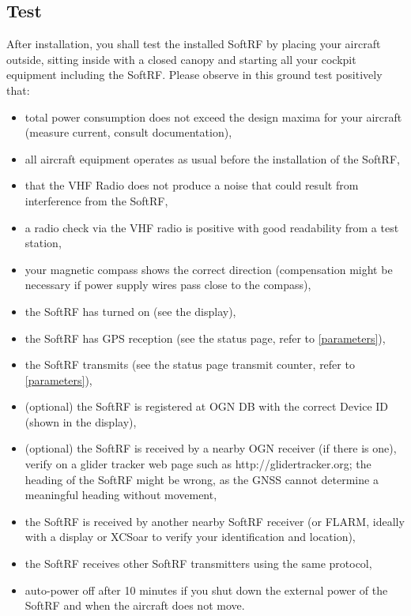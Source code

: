 \documentclass[10pt,a4paper]{article}
\begin{document}
\subsection{Test}\label{test}
After installation, you shall test the installed SoftRF by placing your aircraft outside, sitting inside with a closed canopy and starting all your cockpit equipment including the SoftRF. Please observe in this ground test positively that:

\begin{itemize}
\item total power consumption does not exceed the design maxima for your aircraft (measure current, consult documentation),
\item all aircraft equipment operates as usual before the installation of the SoftRF,
\item that the VHF Radio does not produce a noise that could result from interference from the SoftRF,
\item a radio check via the VHF radio is positive with good readability from a test station,
\item your magnetic compass shows the correct direction (compensation might be necessary if power supply wires pass close to the compass),
\item the SoftRF has turned on (see the display),
\item the SoftRF has GPS reception (see the status page, refer to \ref{parameters}),
\item the SoftRF transmits (see the status page transmit counter, refer to \ref{parameters}),
\item (optional) the SoftRF is registered at OGN DB with the correct Device ID (shown in the display),
\item (optional) the SoftRF is received by a nearby OGN receiver (if there is one), verify on a glider tracker web page such as http://glidertracker.org; the heading of the SoftRF might be wrong, as the GNSS cannot determine a meaningful heading without movement,
\item the SoftRF is received by another nearby SoftRF receiver (or FLARM, ideally with a display or XCSoar to verify your identification and location),
\item the SoftRF receives other SoftRF transmitters using the same protocol,
\item auto-power off after 10 minutes if you shut down the external power of the SoftRF and when the aircraft does not move.
\end{itemize}
\end{document}
